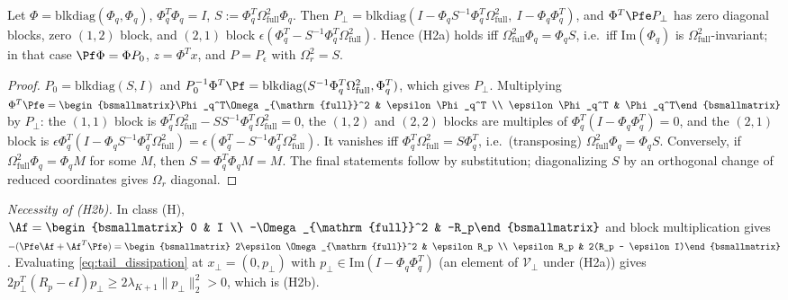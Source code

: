 \begin{lemma}
\label{lem:h2a_char}
Let \(\Phi = \mathrm{blkdiag}(\Phi_q, \Phi_q)\), \(\Phi_q^T\Phi_q = I\), \(S := \Phi_q^T\Omega_{\mathrm{full}}^2\Phi_q\). Then \(P_\perp = \mathrm{blkdiag}(I - \Phi_qS^{-1}\Phi_q^T\Omega_{\mathrm{full}}^2,\ I - \Phi_q\Phi_q^T)\), and \(\Phi^T\Pfe P_\perp\) has zero diagonal blocks, zero \((1,2)\) block, and \((2,1)\) block \(\epsilon(\Phi_q^T - S^{-1}\Phi_q^T\Omega_{\mathrm{full}}^2)\). Hence (H2a) holds iff \(\Omega_{\mathrm{full}}^2\Phi_q = \Phi_qS\), i.e.\ iff \(\mathrm{Im}(\Phi_q)\) is \(\Omega_{\mathrm{full}}^2\)-invariant; in that case \(\Pf\Phi = \Phi P_0\), \(z = \Phi^Tx\), and \(P = P_\epsilon\) with \(\Omega_r^2 = S\).
\end{lemma}
\begin{proof}
\(P_0 = \mathrm{blkdiag}(S, I)\) and \(P_0^{-1}\Phi^T\Pf = \mathrm{blkdiag}(S^{-1}\Phi_q^T\Omega_{\mathrm{full}}^2, \Phi_q^T)\), which gives \(P_\perp\). Multiplying \(\Phi^T\Pfe = \begin{bsmallmatrix}\Phi_q^T\Omega_{\mathrm{full}}^2 & \epsilon\Phi_q^T \\ \epsilon\Phi_q^T & \Phi_q^T\end{bsmallmatrix}\) by \(P_\perp\): the \((1,1)\) block is \(\Phi_q^T\Omega_{\mathrm{full}}^2 - SS^{-1}\Phi_q^T\Omega_{\mathrm{full}}^2 = 0\), the \((1,2)\) and \((2,2)\) blocks are multiples of \(\Phi_q^T(I - \Phi_q\Phi_q^T) = 0\), and the \((2,1)\) block is \(\epsilon\Phi_q^T(I - \Phi_qS^{-1}\Phi_q^T\Omega_{\mathrm{full}}^2) = \epsilon(\Phi_q^T - S^{-1}\Phi_q^T\Omega_{\mathrm{full}}^2)\). It vanishes iff \(\Phi_q^T\Omega_{\mathrm{full}}^2 = S\Phi_q^T\), i.e.\ (transposing) \(\Omega_{\mathrm{full}}^2\Phi_q = \Phi_qS\). Conversely, if \(\Omega_{\mathrm{full}}^2\Phi_q = \Phi_qM\) for some \(M\), then \(S = \Phi_q^T\Phi_qM = M\). The final statements follow by substitution; diagonalizing \(S\) by an orthogonal change of reduced coordinates gives \(\Omega_r\) diagonal.
\end{proof}

\emph{Necessity of (H2b).} In class (H), \(\Af = \begin{bsmallmatrix} 0 & I \\ -\Omega_{\mathrm{full}}^2 & -R_p\end{bsmallmatrix}\) and block multiplication gives \(-(\Pfe\Af + \Af^T\Pfe) = \begin{bsmallmatrix} 2\epsilon\Omega_{\mathrm{full}}^2 & \epsilon R_p \\ \epsilon R_p & 2(R_p - \epsilon I)\end{bsmallmatrix}\). Evaluating \eqref{eq:tail_dissipation} at \(x_\perp = (0, p_\perp)\) with \(p_\perp \in \mathrm{Im}(I - \Phi_q\Phi_q^T)\) (an element of \(\mathcal{V}_\perp\) under (H2a)) gives \(2p_\perp^T(R_p - \epsilon I)p_\perp \ge 2\lambda_{K+1}\|p_\perp\|_2^2 > 0\), which is (H2b).

